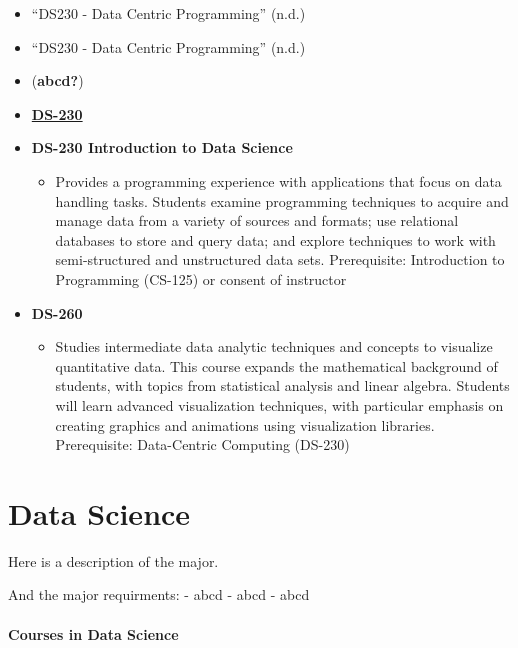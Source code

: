 \documentclass[
  letterpaper,
]{scrbook}
\providecommand{\tightlist}{%
  \setlength{\itemsep}{0pt}\setlength{\parskip}{0pt}}
\begin{document}
\begin{itemize}
\tightlist
\item
  {``DS230 - Data Centric Programming''} (n.d.)
\item
  {``DS230 - Data Centric Programming''} (n.d.)
\item
  (\textbf{abcd?})
\item
  \textbf{\protect\hyperlink{courses-in-data-science}{DS-230}}
\item
  \textbf{DS-230 Introduction to Data Science}

  \begin{itemize}
  \item
    Provides a programming experience with applications that focus on
    data handling tasks. Students examine programming techniques to
    acquire and manage data from a variety of sources and formats; use
    relational databases to store and query data; and explore techniques
    to work with semi-structured and unstructured data sets.
    Prerequisite: Introduction to Programming (CS-125) or consent of
    instructor
  \end{itemize}
\item
  \textbf{DS-260}

  \begin{itemize}
  \item
    Studies intermediate data analytic techniques and concepts to
    visualize quantitative data. This course expands the mathematical
    background of students, with topics from statistical analysis and
    linear algebra. Students will learn advanced visualization
    techniques, with particular emphasis on creating graphics and
    animations using visualization libraries. Prerequisite: Data-Centric
    Computing (DS-230)
  \end{itemize}
\end{itemize}

\hypertarget{data-science}{%
\chapter{Data Science}\label{data-science}}

Here is a description of the major.

And the major requirments: - abcd - abcd - abcd

\hypertarget{courses-in-data-science}{%
\subsubsection{Courses in Data Science}\label{courses-in-data-science}}
\end{document}
